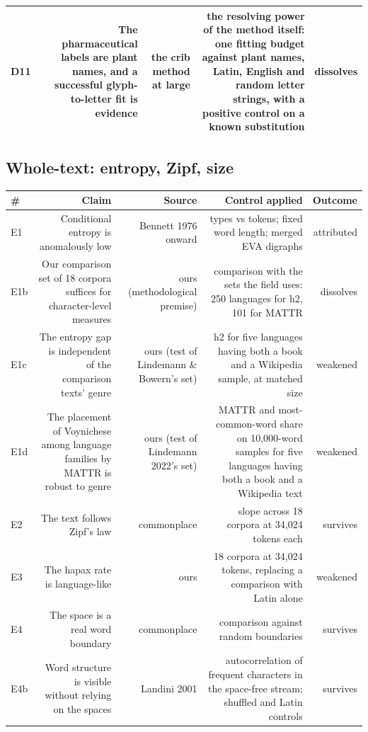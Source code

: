 \documentclass[11pt,a4paper]{article}
\begin{document}
\begin{table}[htbp]
\begin{tabular}{@{}lrrrr@{}}
D11 & The pharmaceutical labels are plant names, and a successful glyph-to-letter fit is evidence & the crib method at large & the resolving power of the method itself: one fitting budget against plant names, Latin, English and random letter strings, with a positive control on a known substitution & dissolves \\
\bottomrule
\end{tabular}
\end{table}

\subsection*{Whole-text: entropy, Zipf, size}


\begin{table}[htbp]\centering\small
\begin{tabular}{@{}lrrrr@{}}
\toprule
\# & Claim & Source & Control applied & Outcome \\
\midrule
E1 & Conditional entropy is anomalously low & Bennett 1976 onward & types vs tokens; fixed word length; merged EVA digraphs & attributed \\
E1b & Our comparison set of 18 corpora suffices for character-level measures & ours (methodological premise) & comparison with the sets the field uses: 250 languages for h2, 101 for MATTR & dissolves \\
E1c & The entropy gap is independent of the comparison texts' genre & ours (test of Lindemann \& Bowern's set) & h2 for five languages having both a book and a Wikipedia sample, at matched size & weakened \\
E1d & The placement of Voynichese among language families by MATTR is robust to genre & ours (test of Lindemann 2022's set) & MATTR and most-common-word share on 10,000-word samples for five languages having both a book and a Wikipedia text & weakened \\
E2 & The text follows Zipf's law & commonplace & slope across 18 corpora at 34,024 tokens each & survives \\
E3 & The hapax rate is language-like & ours & 18 corpora at 34,024 tokens, replacing a comparison with Latin alone & weakened \\
E4 & The space is a real word boundary & commonplace & comparison against random boundaries & survives \\
E4b & Word structure is visible without relying on the spaces & Landini 2001 & autocorrelation of frequent characters in the space-free stream; shuffled and Latin controls & survives \\
\bottomrule
\end{tabular}
\end{table}
\end{document}
